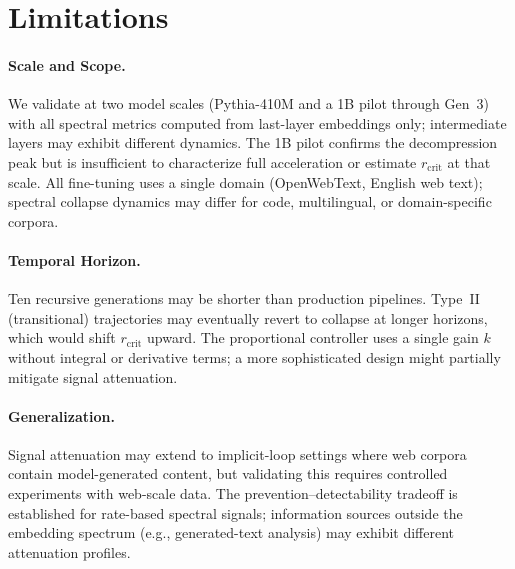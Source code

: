 \section*{Limitations}

\paragraph{Scale and Scope.}
We validate at two model scales (Pythia-410M and a 1B pilot through Gen~3) with all spectral metrics computed from last-layer embeddings only; intermediate layers may exhibit different dynamics.
The 1B pilot confirms the decompression peak but is insufficient to characterize full acceleration or estimate $r_{\text{crit}}$ at that scale.
All fine-tuning uses a single domain (OpenWebText, English web text); spectral collapse dynamics may differ for code, multilingual, or domain-specific corpora.

\paragraph{Temporal Horizon.}
Ten recursive generations may be shorter than production pipelines.
Type~II (transitional) trajectories may eventually revert to collapse at longer horizons, which would shift $r_{\text{crit}}$ upward.
The proportional controller uses a single gain $k$ without integral or derivative terms; a more sophisticated design might partially mitigate signal attenuation.

\paragraph{Generalization.}
Signal attenuation may extend to implicit-loop settings where web corpora contain model-generated content, but validating this requires controlled experiments with web-scale data.
The prevention--detectability tradeoff is established for rate-based spectral signals; information sources outside the embedding spectrum (e.g., generated-text analysis) may exhibit different attenuation profiles.
